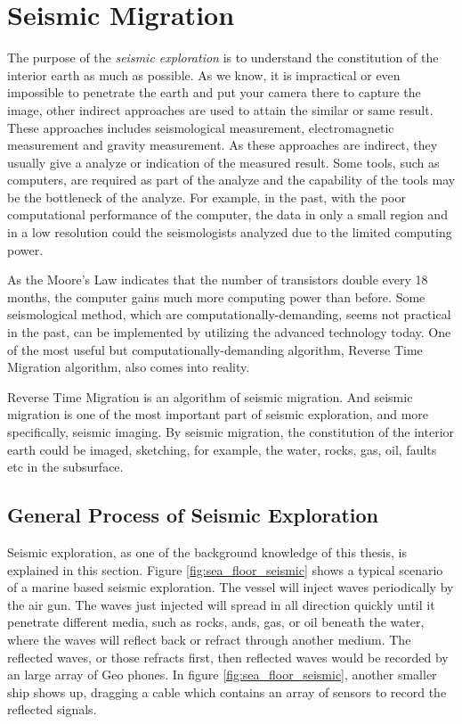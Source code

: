 \section{Seismic Migration}

The purpose of the \emph{seismic exploration} is to understand the
constitution of the interior earth as much as possible. As we know, it is
impractical or even impossible to penetrate the earth and put your camera
there to capture the image, other indirect approaches are used to attain
the similar or same result. These approaches includes seismological
measurement, electromagnetic measurement and gravity measurement. As these
approaches are indirect, they usually give a analyze or indication of the
measured result. Some tools, such as computers, are required as part of the
analyze and the capability of the tools may be the bottleneck of the
analyze. For example, in the past, with the poor computational performance
of the computer, the data in only a small region and in a low resolution
could the seismologists analyzed due to the limited computing power.

As the Moore's Law indicates that the number of transistors double every 18
months, the computer gains much more computing power than before. Some
seismological method, which are computationally-demanding, seems not
practical in the past, can be implemented by utilizing the advanced
technology today. One of the most useful but computationally-demanding
algorithm, Reverse Time Migration algorithm, also comes into reality.

Reverse Time Migration is an algorithm of seismic migration. And seismic
migration is one of the most important part of seismic exploration, and
more specifically, seismic imaging. By seismic migration, the constitution
of the interior earth could be imaged, sketching, for example, the water,
rocks, gas, oil, faults etc in the subsurface.

\subsection{General Process of Seismic Exploration}

Seismic exploration, as one of the background knowledge of this thesis,
is explained in this section. Figure \ref{fig:sea_floor_seismic} shows a
typical scenario of a marine
based seismic exploration. The vessel will inject waves periodically by the
air gun. The waves just injected will spread in all direction quickly until
it penetrate different media, such as rocks, ands, gas, or oil beneath the
water, where the waves will reflect back or refract through another medium.
The reflected waves, or those refracts first, then reflected waves would be
recorded by an large array of Geo phones. In figure
\ref{fig:sea_floor_seismic}, another smaller ship shows up, dragging a
cable
which contains an array of sensors to record the reflected signals.

